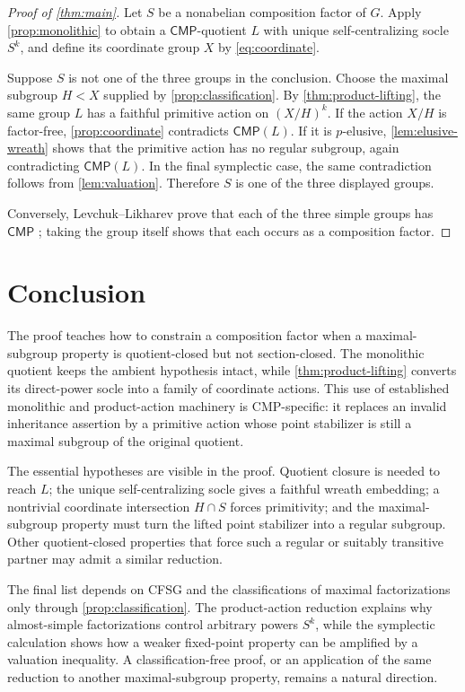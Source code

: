 \documentclass[11pt]{amsart}
\newcommand{\CMP}{\mathsf{CMP}}
\theoremstyle{definition}
\begin{document}
\begin{proof}[Proof of \cref{thm:main}]
Let \(S\) be a nonabelian composition factor of \(G\).  Apply
\cref{prop:monolithic} to obtain a \(\CMP\)-quotient \(L\) with unique
self-centralizing socle \(S^k\), and define its coordinate group \(X\) by
\eqref{eq:coordinate}.

Suppose \(S\) is not one of the three groups in the conclusion.  Choose the
maximal subgroup \(H<X\) supplied by \cref{prop:classification}.  By
\cref{thm:product-lifting}, the same group \(L\) has a faithful primitive action
on \((X/H)^k\).  If the action \(X/H\) is factor-free,
\cref{prop:coordinate} contradicts \(\CMP(L)\).  If it is \(p\)-elusive,
\cref{lem:elusive-wreath} shows that the primitive action has no regular
subgroup, again contradicting \(\CMP(L)\).  In the final symplectic case,
the same contradiction follows from \cref{lem:valuation}.  Therefore \(S\)
is one of the three displayed groups.

Conversely, Levchuk--Likharev prove that each of the three simple groups has
\(\CMP\) \cite[Lemmas 4 and 6]{levchuk-likharev}; taking the group itself shows
that each occurs as a composition factor.
\end{proof}


\section{Conclusion}\label{sec:yield}

The proof teaches how to constrain a composition factor when a maximal-
subgroup property is quotient-closed but not section-closed.  The monolithic
quotient keeps the ambient hypothesis intact, while
\cref{thm:product-lifting} converts its direct-power socle into a family of
coordinate actions.  This use of established monolithic and product-action
machinery is CMP-specific: it replaces an invalid inheritance assertion by a
primitive action whose point stabilizer is still a maximal subgroup of the
original quotient.

The essential hypotheses are visible in the proof.  Quotient closure is
needed to reach \(L\); the unique self-centralizing socle gives a faithful
wreath embedding; a nontrivial coordinate intersection \(H\cap S\) forces
primitivity; and the maximal-subgroup property must turn the lifted point
stabilizer into a regular subgroup.  Other quotient-closed properties that
force such a regular or suitably transitive partner may admit a similar
reduction.

The final list depends on CFSG and the classifications of maximal
factorizations only through \cref{prop:classification}.  The product-action
reduction explains why almost-simple factorizations control arbitrary powers
\(S^k\), while the symplectic calculation shows how a weaker fixed-point
property can be amplified by a valuation inequality.  A classification-free
proof, or an application of the same reduction to another
maximal-subgroup property, remains a natural direction.
\end{document}
